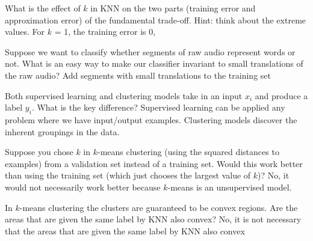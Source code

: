 \documentclass{article}
\def\red#1{{\color{red}#1}}
\begin{document}
{\begin{enumerate}
\end{enumerate}
\item What is the effect of $k$ in KNN on the two parts (training error and approximation error) of the fundamental trade-off. Hint: think about the extreme values. \red{For $k$ = 1, the training error is 0, }
\item Suppose we want to classify whether segments of raw audio represent words or not. What is an easy way to make our classifier invariant to small translations of the raw audio? \red{Add segments with small translations to the training set}
\item Both supervised learning and clustering models take in an input $x_i$ and produce a label $y_i$. What is the key difference? \red{Supervised learning can be applied any problem where we have input/output examples. Clustering models discover the inherent groupings in the data.}
\item Suppose you chose $k$ in $k$-means clustering (using the squared distances to examples) from a validation set instead of a training set. Would this work better than using the training set (which just chooses the largest value of $k$)? \red{No, it would not necessarily work better because $k$-means is an unsupervised model. }
\item In $k$-means clustering the clusters are guaranteed to be convex regions. Are the areas that are given the same label by KNN also convex? \red{No, it is not necessary that the areas that are given the same label by KNN also convex}
}
\end{document}
